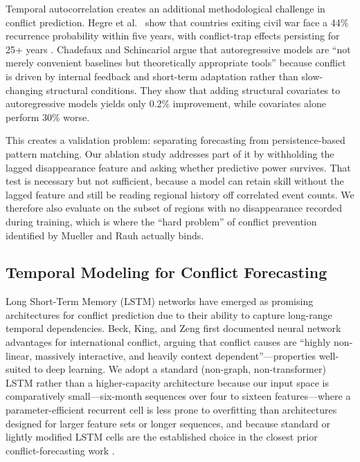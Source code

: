 \documentclass[pdflatex,sn-mathphys-num]{sn-jnl}%
\theoremstyle{thmstyleone}%
\theoremstyle{thmstyletwo}%
\theoremstyle{thmstylethree}%
\begin{document}
Temporal autocorrelation creates an additional methodological challenge in conflict prediction. Hegre et al.~\cite{hegre2017conflict} show that countries exiting civil war face a 44\% recurrence probability within five years, with conflict-trap effects persisting for 25+ years \cite{hegre2017evaluating}. Chadefaux and Schincariol \cite{chadefaux2025endogenous} argue that autoregressive models are ``not merely convenient baselines but theoretically appropriate tools'' because conflict is driven by internal feedback and short-term adaptation rather than slow-changing structural conditions. They show that adding structural covariates to autoregressive models yields only 0.2\% improvement, while covariates alone perform 30\% worse.

This creates a validation problem: separating forecasting from persistence-based pattern matching. Our ablation study addresses part of it by withholding the lagged disappearance feature and asking whether predictive power survives. That test is necessary but not sufficient, because a model can retain skill without the lagged feature and still be reading regional history off correlated event counts. We therefore also evaluate on the subset of regions with no disappearance recorded during training, which is where the ``hard problem'' of conflict prevention identified by Mueller and Rauh \cite{mueller2022hard} actually binds.

\subsection{Temporal Modeling for Conflict Forecasting}

Long Short-Term Memory (LSTM) networks have emerged as promising architectures for conflict prediction due to their ability to capture long-range temporal dependencies. Beck, King, and Zeng \cite{beck2000improving} first documented neural network advantages for international conflict, arguing that conflict causes are ``highly non-linear, massively interactive, and heavily context dependent''---properties well-suited to deep learning. We adopt a standard (non-graph, non-transformer) LSTM rather than a higher-capacity architecture because our input space is comparatively small---six-month sequences over four to sixteen features---where a parameter-efficient recurrent cell is less prone to overfitting than architectures designed for larger feature sets or longer sequences, and because standard or lightly modified LSTM cells are the established choice in the closest prior conflict-forecasting work \cite{malone2022recurrent, radford2022high}.
\end{document}

